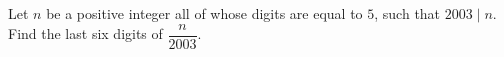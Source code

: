 Let $n$ be a positive integer all of whose digits are equal to $5$, such that $2003\mid n$. Find the last six digits of $\dfrac{n}{2003}$.
